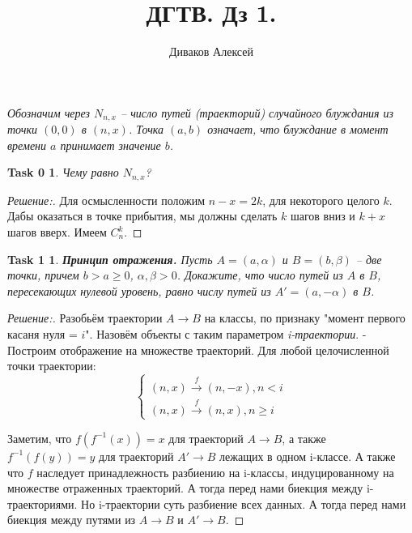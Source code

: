 \documentclass{article}
\newtheorem*{task0}{Task 0}
\newtheorem*{task1}{Task 1}
\begin{document}
\title{ДГТВ. Дз 1.}
\author{Диваков Алексей}   
\date{}



 
\textit{
Обозначим через $N_{n, x}$ -- число путей (траекторий) случайного блуждания из точки $(0, 0)$ в $(n, x)$. Точка $(a, b)$ означает, что
блуждание в момент времени $a$ принимает значение $b$. 
}   
   
    \begin{task0}
        Чему равно $N_{n,x}$? 

    \end{task0}
    \begin{proof}[Решение:]
    Для осмысленности положим $n - x = 2k$, для некоторого целого $k$. Дабы оказаться в точке прибытия, мы должны сделать $k$ шагов вниз и $k+x$ шагов вверх. Имеем $C_{n}^{k}$.
    
    \end{proof}
   
    \vspace{\baselineskip}
    \begin{task1}
        \textbf{Принцип отражения.} Пусть $A = (a, \alpha)$ и $B = (b, \beta)$ -- две точки, причем $b > a \geq 0$,
        $\alpha, \beta > 0$. Докажите, что число путей из $A$ в $B$, пересекающих нулевой уровень, равно числу путей из $A' = (a, -\alpha)$ в $B$.
    \end{task1}
   
    \begin{proof}[Решение:]
       Разобьём траектории $A \rightarrow B$ на классы, по признаку "момент первого касаня нуля = $i$". Назовём объекты с таким параметром \textit{i-траектории}. -  
       Построим отображение на множестве траекторий.
       Для любой целочисленной точки траектории:
       \begin{equation*}
       \begin{cases}
       (n, x) \xrightarrow{f} (n, -x), n < i\\
       (n, x) \xrightarrow{f} (n, x), n \geq i
       \end{cases}
       \end{equation*}

       Заметим, что $f(f^{-1}(x)) = x$ для траекторий $A \rightarrow B$, а также $f^{-1}(f(y)) = y$ для траекторий $A' \rightarrow B$ лежащих в одном i-классе. А также что $f$ наследует принадлежность разбиению на i-классы, индуцированному на множестве отраженных траекторий.
       А тогда перед нами биекция между i-траекториями. Но i-траектории суть разбиение всех данных. А тогда перед нами биекция между путями из $A \rightarrow B$ и $A' \rightarrow B$. 
       
     \end{proof}
                
\end{document}
